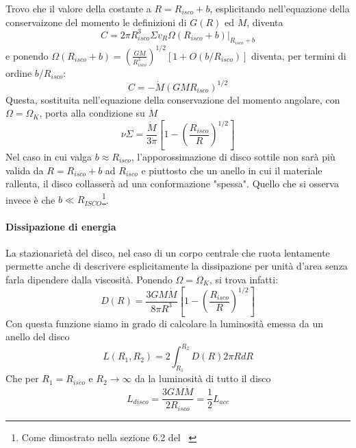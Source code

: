 \documentclass[a4paperbi]{article}
\begin{document}
	Trovo che il valore della costante a $R=R_{isco}+b$, esplicitando nell'equazione della conservaizone del momento le definizioni di $G(R)$ ed $\dot{M}$, diventa
	\begin{equation*}
		C=2\pi R_{isco}^3\Sigma v_R\Omega(R_{isco}+b)\vert_{R_{isco}+b}
	\end{equation*}
	e ponendo $\Omega(R_{isco}+b)=\left(\frac{GM}{R_{isco}^3}\right)^{1/2}[1+O(b/R_{isco})]$ diventa, per termini di ordine $b/R_{isco}$:
	\begin{equation}
		C=-\dot{M}(GMR_{isco})^{1/2}
	\end{equation}
	Questa, sostituita nell'equazione della conservazione del momento angolare, con $\Omega=\Omega_K$, porta alla condizione su $\dot{M}$
	\begin{equation}
		\nu\Sigma=\frac{\dot{M}}{3\pi}\left[1-\left(\frac{R_{isco}}{R}\right)^{1/2}\right]
	\end{equation}
	Nel caso in cui valga $b\approx R_{isco}$, l'apporossimazione di disco sottile non sarà più valida da $R=R_{isco}+b$ ad $R_{isco}$ e piuttosto che un anello in cui il materiale rallenta, il disco collasserà ad una conformazione "spessa". Quello che si osserva invece è che $b\ll R_{ISCO}$\footnote{Come dimostrato nella sezione 6.2 del ~\cite{FrankKingRaineAccretionPower}}.
	
	\paragraph{Dissipazione di energia}
	La stazionarietà del disco, nel caso di un corpo centrale che ruota lentamente permette anche di descrivere esplicitamente la dissipazione per unità d'area senza farla dipendere dalla viscosità. Ponendo $\Omega=\Omega_K$, si trova infatti:
	\begin{equation}
		D(R)=\frac{3GM\dot{M}}{8\pi R^3}\left[1-\left(\frac{R_{isco}}{R}\right)^{1/2}\right]
	\end{equation}	
	Con questa funzione siamo in grado di calcolare la luminosità emessa da un anello del disco
	\begin{equation}
		L(R_1,R_2)=2\int_{R_1}^{R_2}D(R)2\pi RdR
	\end{equation}
	Che per $R_1=R_{isco}$ e $R_2\to\infty$ da la luminosità di tutto il disco
	\begin{equation}
		L_{disco}=\frac{3GM\dot{M}}{2R_{isco}}=\frac{1}{2}L_{acc}
	\end{equation}
	
\end{document}
